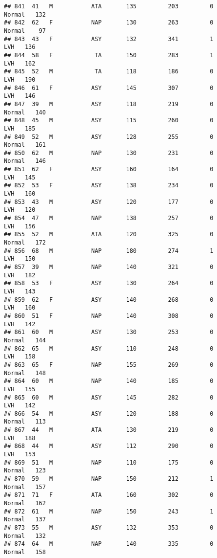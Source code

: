 \documentclass[
]{article}
\begin{document}
\begin{verbatim}
## 841  41   M           ATA       135         203         0     Normal   132
## 842  62   F           NAP       130         263         0     Normal    97
## 843  43   F           ASY       132         341         1        LVH   136
## 844  58   F            TA       150         283         1        LVH   162
## 845  52   M            TA       118         186         0        LVH   190
## 846  61   F           ASY       145         307         0        LVH   146
## 847  39   M           ASY       118         219         0     Normal   140
## 848  45   M           ASY       115         260         0        LVH   185
## 849  52   M           ASY       128         255         0     Normal   161
## 850  62   M           NAP       130         231         0     Normal   146
## 851  62   F           ASY       160         164         0        LVH   145
## 852  53   F           ASY       138         234         0        LVH   160
## 853  43   M           ASY       120         177         0        LVH   120
## 854  47   M           NAP       138         257         0        LVH   156
## 855  52   M           ATA       120         325         0     Normal   172
## 856  68   M           NAP       180         274         1        LVH   150
## 857  39   M           NAP       140         321         0        LVH   182
## 858  53   F           ASY       130         264         0        LVH   143
## 859  62   F           ASY       140         268         0        LVH   160
## 860  51   F           NAP       140         308         0        LVH   142
## 861  60   M           ASY       130         253         0     Normal   144
## 862  65   M           ASY       110         248         0        LVH   158
## 863  65   F           NAP       155         269         0     Normal   148
## 864  60   M           NAP       140         185         0        LVH   155
## 865  60   M           ASY       145         282         0        LVH   142
## 866  54   M           ASY       120         188         0     Normal   113
## 867  44   M           ATA       130         219         0        LVH   188
## 868  44   M           ASY       112         290         0        LVH   153
## 869  51   M           NAP       110         175         0     Normal   123
## 870  59   M           NAP       150         212         1     Normal   157
## 871  71   F           ATA       160         302         0     Normal   162
## 872  61   M           NAP       150         243         1     Normal   137
## 873  55   M           ASY       132         353         0     Normal   132
## 874  64   M           NAP       140         335         0     Normal   158

\end{verbatim}
\end{document}
